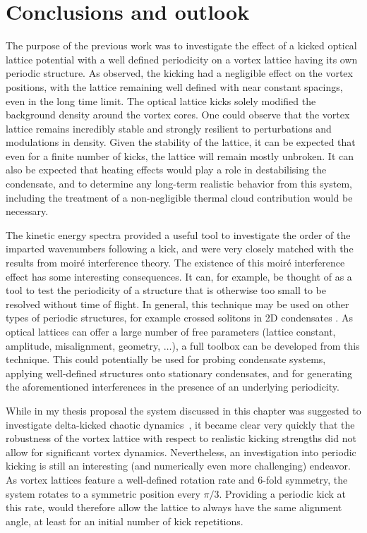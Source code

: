 \section{Conclusions and outlook}\label{sec:ch5_conc}
The purpose of the previous work was to investigate the effect of a kicked optical lattice potential with a well defined periodicity on a vortex lattice having its own periodic structure. As observed, the kicking had a negligible effect on the vortex positions, with the lattice remaining well defined with near constant spacings, even in the long time limit. The optical lattice kicks solely modified the background density around the vortex cores. One could observe that the vortex lattice remains incredibly stable and strongly resilient to perturbations and modulations in density. Given the stability of the lattice, it can be expected that even for a finite number of kicks, the lattice will remain mostly unbroken. It can also be expected that heating effects would play a role in destabilising the condensate, and to determine any long-term realistic behavior from this system, including the treatment of a non-negligible thermal cloud contribution would be necessary.

The kinetic energy spectra provided a useful tool to investigate the order of the imparted wavenumbers following a kick, and were very closely matched with the results from moir\'e interference theory. The existence of this moir\'e interference effect has some interesting consequences. It can, for example, be thought of as a tool to test the periodicity of a structure that is otherwise too small to be resolved without time of flight. In general, this technique may be used on other types of periodic structures, for example crossed solitons in 2D condensates \cite{BEC:Morgan_soliton_2013}. As optical lattices can offer a large number of free parameters (lattice constant, amplitude, misalignment, geometry, $\ldots$), a full toolbox can be developed from this technique. This could potentially be used for probing condensate systems, applying well-defined structures onto stationary condensates, and for generating the aforementioned interferences in the presence of an underlying periodicity.


While in my thesis proposal the system discussed in this chapter was suggested to investigate delta-kicked chaotic dynamics~\cite{CT:Gardiner_pra_2000}, it became clear very quickly that the robustness of the vortex lattice with respect to realistic kicking strengths did not allow for significant vortex dynamics. Nevertheless, an investigation into periodic kicking is still an interesting (and numerically even more challenging) endeavor. As vortex lattices feature a well-defined rotation rate and 6-fold symmetry, the system rotates to a symmetric position every $\pi/3$. Providing a periodic kick at this rate, would therefore allow the lattice to always have the same alignment angle, at least for an initial number of kick repetitions.
